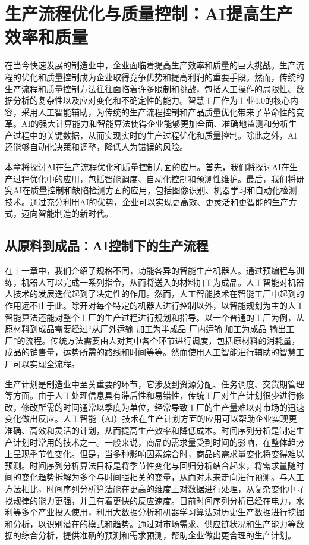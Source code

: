 \section{生产流程优化与质量控制：AI提高生产效率和质量}
在当今快速发展的制造业中，企业面临着提高生产效率和质量的巨大挑战。生产流程的优化和质量控制成为企业取得竞争优势和提高利润的重要手段。然而，传统的生产流程和质量控制方法往往面临着许多限制和挑战，包括人工操作的局限性、数据分析的复杂性以及应对变化和不确定性的能力。智慧工厂作为工业4.0的核心内容，采用人工智能辅助，为传统的生产流程控制和产品质量优化带来了革命性的变革。AI的强大计算能力和智能算法使得企业能够更加全面、准确地监测和分析生产过程中的关键数据，从而实现实时的生产过程优化和质量控制。除此之外，AI还能够自动化决策和调整，降低人为错误的风险。

本章将探讨AI在生产流程优化和质量控制方面的应用。首先，我们将探讨AI在生产过程优化中的应用，包括智能调度、自动化控制和预测性维护。最后，我们将研究AI在质量控制和缺陷检测方面的应用，包括图像识别、机器学习和自动化检测技术。通过充分利用AI的优势，企业可以实现更高效、更灵活和更智能的生产方式，迈向智能制造的新时代。

\subsection{从原料到成品：AI控制下的生产流程}
在上一章中，我们介绍了规格不同，功能各异的智能生产机器人。通过预编程与训练，机器人可以完成一系列指令，从而将送入的材料加工为成品。人工智能对机器人技术的发展迭代起到了决定性的作用。然而，人工智能技术在智能工厂中起到的作用远不止于此。除开对每个特定的机器人进行控制以外，以智能规划为主的人工智能算法还能对整个工厂的生产过程进行规划和指导。以一个普通的工厂为例，从原材料到成品需要经过“从厂外运输-加工为半成品-厂内运输-加工为成品-输出工厂”的流程。传统方法需要由人对其中各个环节进行调度，包括原材料的消耗量，成品的销售量，运势所需的路线和时间等等。然而使用人工智能进行辅助的智慧工厂可以实现全流程。

生产计划是制造业中至关重要的环节，它涉及到资源分配、任务调度、交货期管理等方面。由于人工处理信息具有滞后性和易错性，传统工厂对生产计划很少进行修改，修改所需的时间通常以季度为单位，经常导致工厂的生产量难以对市场的迅速变化做出反应。人工智能（AI）技术在生产计划方面的应用可以帮助企业实现更准确、高效和灵活的计划，从而提高生产效率和降低成本。时间序列分析是制定生产计划时常用的技术之一。一般来说，商品的需求量受到时间的影响，在整体趋势上呈现季节性变化。但是，当多种影响因素综合时，商品的需求量变化将变得难以预测。时间序列分析算法目标是将季节性变化与回归分析结合起来，将需求量随时间的变化趋势拆解为多个与时间强相关的变量，从而对未来走向进行预测。与人工方法相比，时间序列分析算法能在更高的维度上对数据进行处理，从复杂变化中寻找规律的能力更强，并且有着更快的反应速度。目前时间序列分析已经在电力，水利等多个产业投入使用，利用大数据分析和机器学习算法对历史生产数据进行挖掘和分析，以识别潜在的模式和趋势。通过对市场需求、供应链状况和生产能力等数据的综合分析，提供准确的预测和需求预测，帮助企业做出更合理的生产计划。

